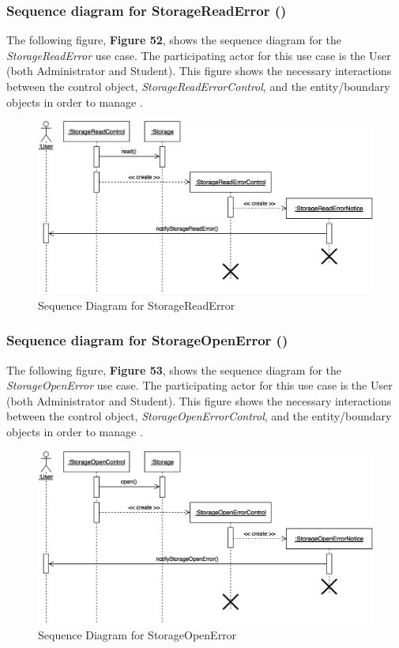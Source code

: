\documentclass[12pt,letterpaper]{article}
\begin{document}
\subsubsection*{Sequence diagram for StorageReadError (\storagereaderror{})}

The following figure, {\bf Figure 52}, shows the sequence diagram for the {\it StorageReadError} use case. The participating actor for this use case is
the User (both Administrator and Student). This figure shows the necessary interactions between the control object, {\it StorageReadErrorControl}, and the
entity/boundary objects in order to manage \storagereaderror{}.

\begin{figure}[H]
	\centering{}
	\includegraphics[scale=0.3]{imgs/seq/storage-read-error.png}
	\caption{Sequence Diagram for StorageReadError}
\end{figure}

\subsubsection*{Sequence diagram for StorageOpenError (\storageopenerror{})}

The following figure, {\bf Figure 53}, shows the sequence diagram for the {\it StorageOpenError} use case. The participating actor for this use case is
the User (both Administrator and Student). This figure shows the necessary interactions between the control object, {\it StorageOpenErrorControl}, and the
entity/boundary objects in order to manage \storageopenerror{}.

\begin{figure}[H]
	\centering{}
	\includegraphics[scale=0.3]{imgs/seq/storage-open-error.png}
	\caption{Sequence Diagram for StorageOpenError}
\end{figure}
\end{document}
